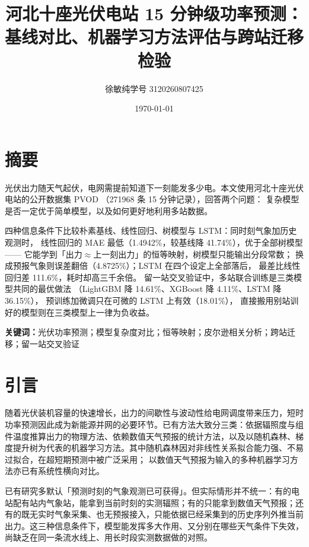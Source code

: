 \documentclass[11pt,a4paper]{ctexart}
\title{河北十座光伏电站 15 分钟级功率预测：\\基线对比、机器学习方法评估与跨站迁移检验}
\author{徐敏纯\quad 学号 3120260807425}
\date{\today}
\begin{document}
\maketitle

\section*{摘要}

光伏出力随天气起伏，电网需提前知道下一刻能发多少电。本文使用河北十座光伏电站的公开数据集 PVOD%
\cite{yao2021photovoltaic,pvod}（271968 条 15 分钟记录），回答两个问题：
复杂模型是否一定优于简单模型，以及如何更好地利用多站数据。

四种信息条件下比较朴素基线、线性回归、树模型与 LSTM：同时刻气象加历史观测时，
线性回归的 MAE 最低（1.4942\%，较基线降 41.74\%），优于全部树模型——
它能学到「出力$\approx$上一刻出力」的恒等映射，树模型只能输出分段常数；
换成预报气象则误差翻倍（4.8725\%）；LSTM 在四个设定上全部落后，
最差比线性回归差 111.6\%，耗时却高三千余倍。
留一站交叉验证中，多站联合训练是三类模型共同的最优做法
（LightGBM 降 14.61\%、XGBoost 降 4.11\%、LSTM 降 36.15\%），
预训练加微调只在可微的 LSTM 上有效（18.01\%），
直接搬用别站训好的模型则在三类模型上一律为负收益。

\noindent\textbf{关键词：}光伏功率预测；模型复杂度对比；恒等映射；皮尔逊相关分析；跨站迁移；留一站交叉验证

\section{引言}

随着光伏装机容量的快速增长，出力的间歇性与波动性给电网调度带来压力，短时功率预测因此成为新能源并网的必要环节\cite{antonanzas2016review}。已有方法大致分三类：依据辐照度与组件温度推算出力的物理方法、依赖数值天气预报的统计方法，以及以随机森林、梯度提升树为代表的机器学习方法\cite{inman2013solar,sobroi2018review}。其中随机森林因对非线性关系拟合能力强、不易过拟合，在超短期预测中被广泛采用\cite{yang2021improved}；
以数值天气预报为输入的多种机器学习方法亦已有系统性横向对比\cite{markovics2022comparison}。

已有研究多默认「预测时刻的气象观测已可获得」。但实际情形并不统一：有的电站配有站内气象站，能拿到当前时刻的实测辐照；有的只能拿到数值天气预报；还有的既无实时气象采集、也无预报接入，只能依据已经采集到的历史序列外推当前出力。这三种信息条件下，模型能发挥多大作用、又分别在哪些天气条件下失效，尚缺乏在同一条流水线上、用长时段实测数据做的对照。
\end{document}
